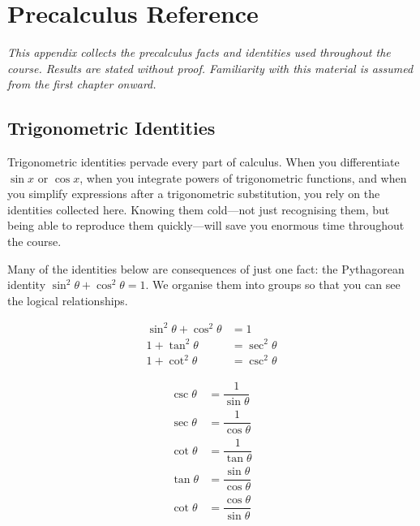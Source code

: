 \chapter{Precalculus Reference}

\textit{This appendix collects the precalculus facts and identities
used throughout the course. Results are stated without proof.
Familiarity with this material is assumed from the first chapter onward.}

\section{Trigonometric Identities}
\label{sec:A.1}

Trigonometric identities pervade every part of calculus. When you
differentiate $\sin x$ or $\cos x$, when you integrate powers of
trigonometric functions, and when you simplify expressions after a
trigonometric substitution, you rely on the identities collected here.
Knowing them cold---not just recognising them, but being able to
reproduce them quickly---will save you enormous time throughout the
course.

Many of the identities below are consequences of just one fact: the
Pythagorean identity $\sin^2\theta + \cos^2\theta = 1$.  We organise
them into groups so that you can see the logical relationships.

\begin{proposition}\label{prop:A-1}
\begin{align*}
  \sin^2\theta + \cos^2\theta &= 1 \\
  1 + \tan^2\theta            &= \sec^2\theta \\
  1 + \cot^2\theta            &= \csc^2\theta
\end{align*}
\end{proposition}

\begin{proposition}\label{prop:A-2}
\begin{align*}
  \csc\theta &= \dfrac{1}{\sin\theta} \\
  \sec\theta &= \dfrac{1}{\cos\theta} \\
  \cot\theta &= \dfrac{1}{\tan\theta} \\
  \tan\theta &= \dfrac{\sin\theta}{\cos\theta} \\
  \cot\theta &= \dfrac{\cos\theta}{\sin\theta}
\end{align*}
\end{proposition}

